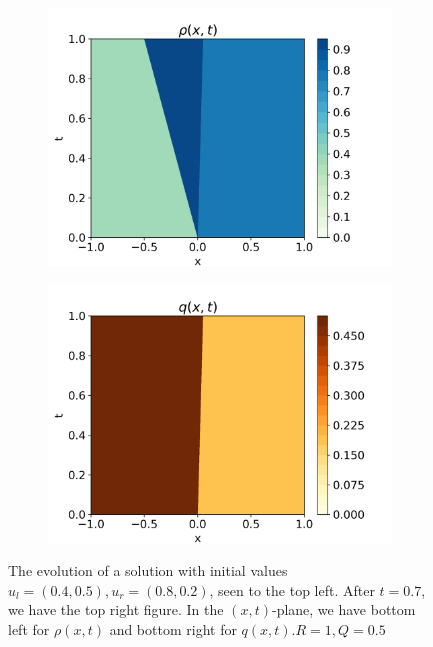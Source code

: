 \documentclass[10pt]{article}
\numberwithin{equation}{section}
\begin{document}
\begin{figure}[H]
\begin{subfigure}[b]{0.35\textwidth}
         \includegraphics[width=\textwidth]{Figures/Model/SysContactsRho.png}
     \end{subfigure}
     \begin{subfigure}[b]{0.35\textwidth}
         \centering
         \includegraphics[width=\textwidth]{Figures/Model/SysContactsQ.png}
     \end{subfigure}
        \caption{The evolution of a solution with initial values $u_l = (0.4, 0.5 ), u_r = (0.8, 0.2)$, seen to the top left. After $t = 0.7$, we have the top right figure. In the $(x,t)$-plane, we have bottom left for $\rho(x,t)$ and bottom right for $q(x,t)$.$R = 1, Q = 0.5$}
        \label{fig:ExampleSysContact}
\end{figure}
\end{document}
